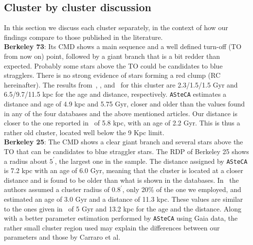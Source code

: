 \documentclass[draft]{aa}
\begin{document}
 \subsection{Cluster by cluster discussion}
  \label{ssec:indiv_clusters}

  In this section we discuss each cluster separately, in the context of how our
  findings compare to those published in the literature.\\

  \noindent \textbf{Berkeley 73}: Its CMD shows a main sequence and a well
  defined turn-off (TO from now on) point, followed by a giant branch that is a
  bit redder than expected. Probably some stars above the TO could be candidates
  to blue stragglers. There is no strong evidence of stars forming a red clump 
  (RC hereinafter).
  The results from~\cite{Ortolani_2005}, \cite{Carraro_2005},
  and~\cite{Carraro_2007_oldOC} for this cluster are 2.3/1.5/1.5 Gyr and
  6.5/9.7/11.5 kpc for the age and distance, respectively.
  \texttt{ASteCA} estimates a distance and age of 4.9 kpc and 5.75 Gyr,
  closer and older than the values found in any of the four databases and the
  above mentioned articles. Our distance is closer to the one reported
  in~\cite{Dias_2021} of 5.8 kpc, with an age of 2.2 Gyr. This is thus a
  rather old cluster, located well below the 9 Kpc limit.\\

  \textbf{Berkeley 25}: The CMD shows a clear giant branch and several stars
  above the TO that can be candidates to blue straggler stars. The RDP of
  Berkeley 25 shows a radius about $5^{\prime}$, the largest one in the sample.
  The distance assigned by \texttt{ASteCA} is 7.2 kpc with an age of 6.0 Gyr,
  meaning that the cluster is located at a closer distance and is found to be
  older than what is shown in the databases.
  In~\cite{Carraro_2005} the authors assumed a cluster radius of $0.8^{\prime}$,
  only 20\% of the one we employed, and estimated an age of 3.0 Gyr and a
  distance of 11.3 kpc. These values are similar to the ones given
  in~\cite{Carraro_2007_oldOC} of 5 Gyr and 13.2 kpc for the age and the
  distance.
  Along with a better parameter estimation performed by \texttt{ASteCA} using
  Gaia data, the rather small cluster region used may explain the differences
  between our parameters and those by Carraro et al.\\
\end{document}
